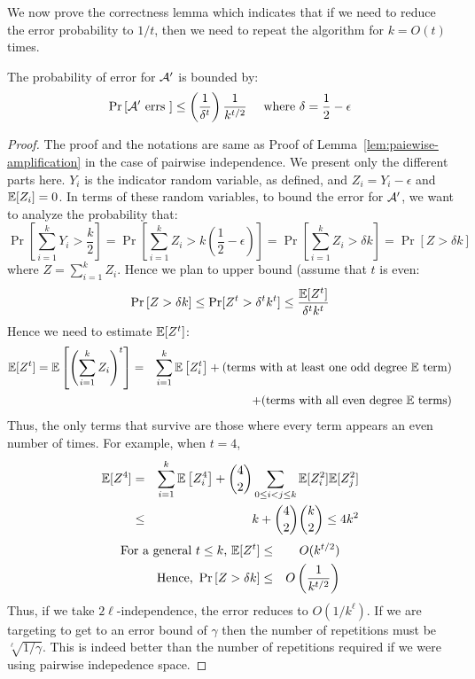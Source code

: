 We now prove the correctness lemma which indicates that if we need to reduce the error probability to $1/t$, then we need to repeat the algorithm for $k=O(t)$ times.
\begin{lemma}
The probability of error for ${\cal A}'$ is bounded by:
$$\Pr\left[{\cal A}' \textrm{ errs }\right] \le \left(\frac{1}{\delta^t}\right)\frac{1}{k^{t/2}} \textrm{~~~~where $\delta = \frac{1}{2}-\epsilon$}$$
\end{lemma}
\begin{proof}
The proof and the notations are same as Proof of Lemma~\ref{lem:paiewise-amplification} in the case of pairwise independence. We present only the different parts here.
$Y_i$ is the indicator random variable, as defined, and $Z_i = Y_i -\epsilon$ and ${\mathbb E}[Z_i]=0$. In terms of these random variables, to bound the error for ${\cal A}'$, we want to analyze the probability that:
$$\Pr \left[ \sum_{i=1}^k Y_i > \frac{k}{2}\right] = \Pr \left[ \sum_{i=1}^k Z_i > k\left(\frac{1}{2}-\epsilon\right) \right] = \Pr \left[ \sum_{i=1}^k Z_i > \delta k \right] =\Pr \left[ Z > \delta k \right] $$
where $Z = \sum_{i=1}^k Z_i$. Hence we plan to upper bound (assume that $t$ is even:
\begin{eqnarray*}
\Pr \left[ Z > \delta k \right] \le \Pr[Z^t > \delta^t k^t] \le \frac{{\mathbb E}[Z^t]}{\delta^tk^t}
\end{eqnarray*}
Hence we need to estimate ${\mathbb E}[Z^t]$:
\begin{eqnarray*}
{\mathbb E}[Z^t] = {\mathbb E}\left[ \left(\sum_{i=1}^k Z_i\right)^t \right] & = &  \sum_{i=1}^k {\mathbb E}\left[Z_i^t\right] + \textrm{(terms with at least one odd degree ${\mathbb E}$ term)} \\ 
&& + \textrm{(terms with all even degree ${\mathbb E}$ terms)}
\end{eqnarray*}
Thus, the only terms that survive are those where every term appears an even number of times. For example, when $t = 4$,
\begin{eqnarray*}
{\mathbb E}[Z^4] & = &  \sum_{i=1}^k {\mathbb E}\left[Z_i^4\right] + {4 \choose 2} \sum_{0 \le i < j \le k} {\mathbb E}[Z_i^2]{\mathbb E}[Z_j^2] \\ 
& \le & k+{4 \choose 2}{k \choose 2} \le 4k^2
\end{eqnarray*}
\begin{eqnarray*}
\textrm{For a general $t \le k$, }{\mathbb E}[Z^t] & \le & O(k^{t/2}) \\
\textrm{Hence, } \Pr \left[ Z > \delta k \right] & \le & O\left(\frac{1}{k^{t/2}}\right)
\end{eqnarray*}
Thus, if we take $2\ell$-independence, the error reduces to $O(1/k^\ell)$. If we are targeting to get to an error bound of $\gamma$ then the number of repetitions must be $\sqrt[\ell]{1/\gamma}$. This is indeed better than the number of repetitions required if we were using pairwise indepedence space.
\end{proof}


